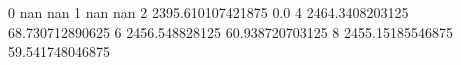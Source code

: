 0 nan nan
1 nan nan
2 2395.610107421875 0.0
4 2464.3408203125 68.730712890625
6 2456.548828125 60.938720703125
8 2455.15185546875 59.541748046875
